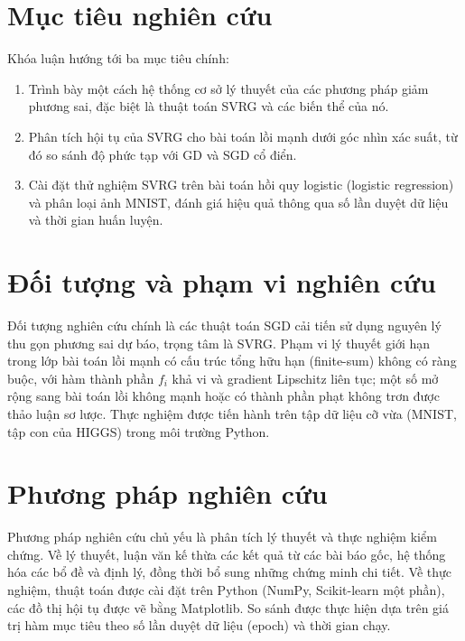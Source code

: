 \documentclass[12pt,a4paper]{report}
\theoremstyle{definition}
\begin{document}
\section*{Mục tiêu nghiên cứu}
Khóa luận hướng tới ba mục tiêu chính:
\begin{enumerate}
    \item Trình bày một cách hệ thống cơ sở lý thuyết của các phương pháp giảm phương sai, đặc biệt là thuật toán SVRG và các biến thể của nó.
    \item Phân tích hội tụ của SVRG cho bài toán lồi mạnh dưới góc nhìn xác suất, từ đó so sánh độ phức tạp với GD và SGD cổ điển.
    \item Cài đặt thử nghiệm SVRG trên bài toán hồi quy logistic (logistic regression) và phân loại ảnh MNIST, đánh giá hiệu quả thông qua số lần duyệt dữ liệu và thời gian huấn luyện.
\end{enumerate}

\section*{Đối tượng và phạm vi nghiên cứu}
Đối tượng nghiên cứu chính là các thuật toán SGD cải tiến sử dụng nguyên lý thu gọn phương sai dự báo, trọng tâm là SVRG. Phạm vi lý thuyết giới hạn trong lớp bài toán lồi mạnh có cấu trúc tổng hữu hạn (finite-sum) không có ràng buộc, với hàm thành phần $f_i$ khả vi và gradient Lipschitz liên tục; một số mở rộng sang bài toán lồi không mạnh hoặc có thành phần phạt không trơn được thảo luận sơ lược. Thực nghiệm được tiến hành trên tập dữ liệu cỡ vừa (MNIST, tập con của HIGGS) trong môi trường Python.

\section*{Phương pháp nghiên cứu}
Phương pháp nghiên cứu chủ yếu là phân tích lý thuyết và thực nghiệm kiểm chứng. Về lý thuyết, luận văn kế thừa các kết quả từ các bài báo gốc, hệ thống hóa các bổ đề và định lý, đồng thời bổ sung những chứng minh chi tiết. Về thực nghiệm, thuật toán được cài đặt trên Python (NumPy, Scikit-learn một phần), các đồ thị hội tụ được vẽ bằng Matplotlib. So sánh được thực hiện dựa trên giá trị hàm mục tiêu theo số lần duyệt dữ liệu (epoch) và thời gian chạy.
\end{document}
